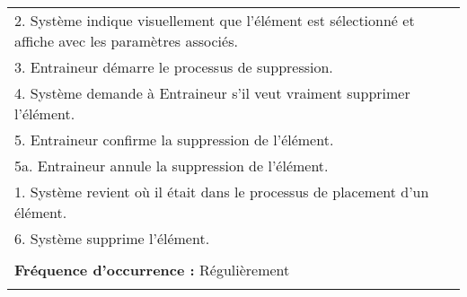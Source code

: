 \begin{longtable}{|p{16cm}|}
	\hspace{0.5cm}2. Système indique visuellement que l'élément est sélectionné et affiche avec les paramètres associés.\\
	\hspace{0.5cm}3. Entraineur démarre le processus de suppression.\\
	\hspace{0.5cm}4. Système demande à Entraineur s'il veut vraiment supprimer l'élément.\\
	\hspace{0.5cm}5. Entraineur confirme la suppression de l'élément.\\
	\hspace{1cm}5a. Entraineur annule la suppression de l'élément.\\
	\hspace{1.5cm}1. Système revient où il était dans le processus de placement d'un élément.\\
	\hspace{0.5cm}6. Système supprime l'élément.\\
	\\
	\textbf{Fréquence d'occurrence :} Régulièrement\\
	\\
	\hline
\end{longtable}

